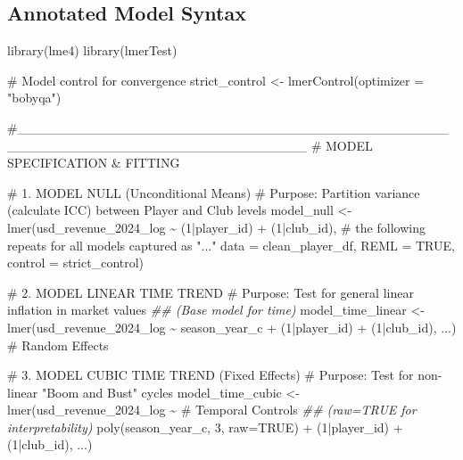 \documentclass[
  12pt,
]{article}
\newenvironment{Shaded}{\begin{snugshade}}{\end{snugshade}}
\newcommand{\AttributeTok}[1]{\textcolor[rgb]{0.40,0.45,0.13}{#1}}
\newcommand{\CommentTok}[1]{\textcolor[rgb]{0.37,0.37,0.37}{#1}}
\newcommand{\ConstantTok}[1]{\textcolor[rgb]{0.56,0.35,0.01}{#1}}
\newcommand{\DecValTok}[1]{\textcolor[rgb]{0.68,0.00,0.00}{#1}}
\newcommand{\DocumentationTok}[1]{\textcolor[rgb]{0.37,0.37,0.37}{\textit{#1}}}
\newcommand{\FunctionTok}[1]{\textcolor[rgb]{0.28,0.35,0.67}{#1}}
\newcommand{\NormalTok}[1]{\textcolor[rgb]{0.00,0.23,0.31}{#1}}
\newcommand{\OtherTok}[1]{\textcolor[rgb]{0.00,0.23,0.31}{#1}}
\newcommand{\SpecialCharTok}[1]{\textcolor[rgb]{0.37,0.37,0.37}{#1}}
\newcommand{\StringTok}[1]{\textcolor[rgb]{0.13,0.47,0.30}{#1}}
\begin{document}
\subsection{Annotated Model Syntax}\label{annotated-model-syntax}

\small

\begin{Shaded}
\begin{Highlighting}[]
\FunctionTok{library}\NormalTok{(lme4)}
\FunctionTok{library}\NormalTok{(lmerTest)}

\CommentTok{\# Model control for convergence}
\NormalTok{strict\_control }\OtherTok{\textless{}{-}} \FunctionTok{lmerControl}\NormalTok{(}\AttributeTok{optimizer =} \StringTok{"bobyqa"}\NormalTok{)}

\CommentTok{\#\_\_\_\_\_\_\_\_\_\_\_\_\_\_\_\_\_\_\_\_\_\_\_\_\_\_\_\_\_\_\_\_\_\_\_\_\_\_\_\_\_\_\_\_\_\_\_\_\_\_\_\_\_\_\_\_\_\_\_\_\_\_\_\_\_\_\_\_\_\_\_\_\_\_\_\_\_\_}
\CommentTok{\# MODEL SPECIFICATION \& FITTING}

\CommentTok{\# 1. MODEL NULL (Unconditional Means)}
\CommentTok{\# Purpose: Partition variance (calculate ICC) between Player and Club levels}
\NormalTok{model\_null }\OtherTok{\textless{}{-}} \FunctionTok{lmer}\NormalTok{(usd\_revenue\_2024\_log }\SpecialCharTok{\textasciitilde{}}\NormalTok{ (}\DecValTok{1}\SpecialCharTok{|}\NormalTok{player\_id) }\SpecialCharTok{+}\NormalTok{ (}\DecValTok{1}\SpecialCharTok{|}\NormalTok{club\_id), }
                   \CommentTok{\# the following repeats for all models captured as "..."}
                   \AttributeTok{data =}\NormalTok{ clean\_player\_df, }
                   \AttributeTok{REML =} \ConstantTok{TRUE}\NormalTok{, }
                   \AttributeTok{control =}\NormalTok{ strict\_control)}

\CommentTok{\# 2. MODEL LINEAR TIME TREND}
\CommentTok{\# Purpose: Test for general linear inflation in market values }
\DocumentationTok{\#\# (Base model for time)}
\NormalTok{model\_time\_linear }\OtherTok{\textless{}{-}} \FunctionTok{lmer}\NormalTok{(usd\_revenue\_2024\_log }\SpecialCharTok{\textasciitilde{}}\NormalTok{ season\_year\_c }\SpecialCharTok{+} 
\NormalTok{                          (}\DecValTok{1}\SpecialCharTok{|}\NormalTok{player\_id) }\SpecialCharTok{+}\NormalTok{ (}\DecValTok{1}\SpecialCharTok{|}\NormalTok{club\_id), ...) }\CommentTok{\# Random Effects}

\CommentTok{\# 3. MODEL CUBIC TIME TREND (Fixed Effects)}
\CommentTok{\# Purpose: Test for non{-}linear "Boom and Bust" cycles}
\NormalTok{model\_time\_cubic }\OtherTok{\textless{}{-}} \FunctionTok{lmer}\NormalTok{(usd\_revenue\_2024\_log }\SpecialCharTok{\textasciitilde{}} 
                           \CommentTok{\# Temporal Controls}
                           \DocumentationTok{\#\# (raw=TRUE for interpretability)}
                           \FunctionTok{poly}\NormalTok{(season\_year\_c, }\DecValTok{3}\NormalTok{, }\AttributeTok{raw=}\ConstantTok{TRUE}\NormalTok{) }\SpecialCharTok{+} 
\NormalTok{                         (}\DecValTok{1}\SpecialCharTok{|}\NormalTok{player\_id) }\SpecialCharTok{+}\NormalTok{ (}\DecValTok{1}\SpecialCharTok{|}\NormalTok{club\_id), ...)}


\end{Highlighting}
\end{Shaded}
\end{document}
